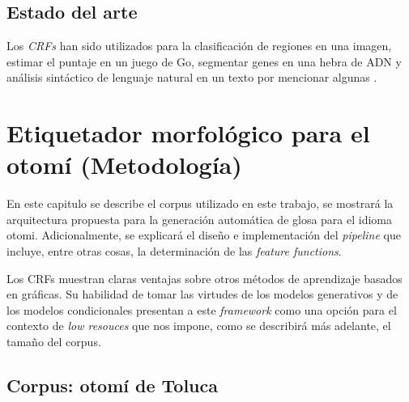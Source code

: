 \documentclass[letterpaper,12pt,oneside]{book}
\begin{document}
	
	\section{Estado del arte}

	
	Los \textit{CRFs} han sido utilizados para la clasificación de regiones en una imagen, estimar el puntaje en un juego de Go, segmentar genes en una hebra de ADN y análisis sintáctico de lenguaje natural en un texto por mencionar algunas \citep{sutton2012introduction}.

	

	



	
	
	\chapter{Etiquetador morfológico para el otomí (Metodología)}

	
	En este capitulo se describe el corpus utilizado en este trabajo, se mostrará la arquitectura propuesta para la generación automática de glosa para el idioma otomi. Adicionalmente, se explicará el diseño e implementación del \textit{pipeline} que incluye, entre otras cosas, la determinación de las \textit{feature functions}.

	

	
	Los CRFs muestran claras ventajas sobre otros métodos de aprendizaje basados en gráficas. Su habilidad de tomar las virtudes de los modelos generativos y de los modelos condicionales presentan a este \textit{framework} como una opción para el contexto de \textit{low resouces} que nos impone, como se describirá más adelante, el tamaño del corpus.

	
	

	\section{Corpus: otomí de Toluca}

	

	
\end{document}
